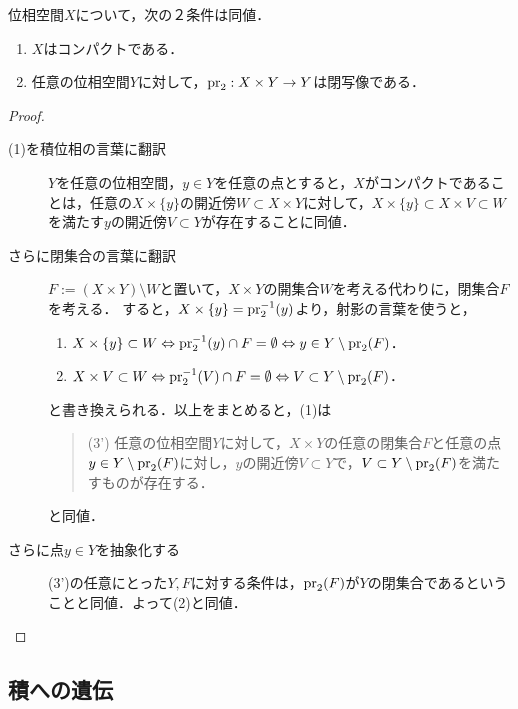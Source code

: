\documentclass[uplatex,dvipdfmx]{jsreport}
\begin{document}
\begin{proposition}[コンパクト性の射影の言葉による特徴付け]\label{prop-characterization-of-compactness-in-terms-of-projection}
    位相空間$X$について，次の２条件は同値．
    \begin{enumerate}
        \item $X$はコンパクトである．
        \item 任意の位相空間$Y$に対して，$\mathrm{pr}_2:X\times Y\to Y$は閉写像である．
    \end{enumerate}
\end{proposition}
\begin{proof}\mbox{}
    \begin{description}
        \item[(1)を積位相の言葉に翻訳] 
        $Y$を任意の位相空間，$y\in Y$を任意の点とすると，$X$がコンパクトであることは，任意の$X\times\{y\}$の開近傍$W\subset X\times Y$に対して，$X\times\{y\}\subset X\times V\subset W$を満たす$y$の開近傍$V\subset Y$が存在することに同値．
        \item[さらに閉集合の言葉に翻訳]
        $F:=(X\times Y)\setminus W$と置いて，$X\times Y$の開集合$W$を考える代わりに，閉集合$F$を考える．
        すると，$X\times\{y\}=\mathrm{pr}_2^{-1}(y)$より，射影の言葉を使うと，
        \begin{enumerate}
            \item $X\times\{y\}\subset W\Leftrightarrow\mathrm{pr}_2^{-1}(y)\cap F=\emptyset\Leftrightarrow y\in Y\setminus\mathrm{pr}_2(F)$．
            \item $X\times V\subset W\Leftrightarrow\mathrm{pr}_2^{-1}(V)\cap F=\emptyset\Leftrightarrow V\subset Y\setminus\mathrm{pr}_2(F)$．
        \end{enumerate}
        と書き換えられる．以上をまとめると，(1)は
        \begin{quote}
            (3') 任意の位相空間$Y$に対して，$X\times Y$の任意の閉集合$F$と任意の点$y\in Y\setminus\mathrm{pr}_2(F)$に対し，$y$の開近傍$V\subset Y$で，$V\subset Y\setminus\mathrm{pr}_2(F)$を満たすものが存在する．
        \end{quote}
        と同値．
        \item[さらに点$y\in Y$を抽象化する]
        (3')の任意にとった$Y,F$に対する条件は，$\mathrm{pr}_2(F)$が$Y$の閉集合であるということと同値．よって(2)と同値．
    \end{description}
\end{proof}

\subsection{積への遺伝}
\end{document}
